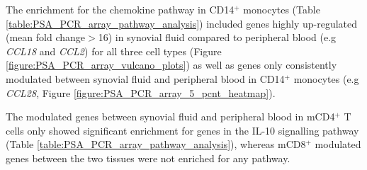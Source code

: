 The enrichment for the chemokine pathway in CD14$^+$ monocytes (Table \ref{table:PSA_PCR_array_pathway_analysis}) included genes highly up-regulated (mean fold change$>$16) in synovial fluid compared to peripheral blood (e.g \textit{CCL18} and \textit{CCL2}) for all three cell types (Figure \ref{figure:PSA_PCR_array_vulcano_plots}) as well as genes only consistently modulated between synovial fluid and peripheral blood in CD14$^+$ monocytes (e.g \textit{CCL28}, Figure \ref{figure:PSA_PCR_array_5_pcnt_heatmap}). %

The modulated genes between synovial fluid and peripheral blood in mCD4$^+$ T cells only showed significant enrichment for genes in the IL-10 signalling pathway (Table \ref{table:PSA_PCR_array_pathway_analysis}), whereas mCD8$^+$ modulated genes between the two tissues were not enriched for any pathway.



